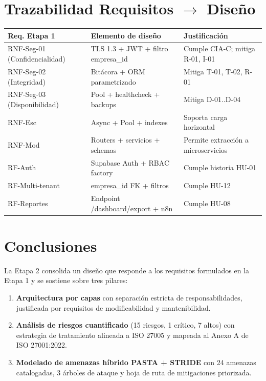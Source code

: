 \documentclass[12pt,a4paper,oneside]{article}
\begin{document}
\section{Trazabilidad Requisitos $\rightarrow$ Diseño}

\begin{table}[h]
\centering
\small
\begin{tabularx}{\textwidth}{llX}
\toprule
\textbf{Req. Etapa 1} & \textbf{Elemento de diseño} & \textbf{Justificación} \\
\midrule
RNF-Seg-01 (Confidencialidad) & TLS 1.3 + JWT + filtro empresa\_id & Cumple CIA-C; mitiga R-01, I-01 \\
RNF-Seg-02 (Integridad) & Bitácora + ORM parametrizado & Mitiga T-01, T-02, R-01 \\
RNF-Seg-03 (Disponibilidad) & Pool + healthcheck + backups & Mitiga D-01..D-04 \\
RNF-Esc & Async + Pool + indexes & Soporta carga horizontal \\
RNF-Mod & Routers + servicios + schemas & Permite extracción a microservicios \\
RF-Auth & Supabase Auth + RBAC factory & Cumple historia HU-01 \\
RF-Multi-tenant & empresa\_id FK + filtros & Cumple HU-12 \\
RF-Reportes & Endpoint /dashboard/export + n8n & Cumple HU-08 \\
\bottomrule
\end{tabularx}
\end{table}

\section{Conclusiones}

La Etapa 2 consolida un diseño que responde a los requisitos formulados en la Etapa 1 y se sostiene sobre tres pilares:

\begin{enumerate}[leftmargin=*]
  \item \textbf{Arquitectura por capas} con separación estricta de responsabilidades, justificada por requisitos de modificabilidad y mantenibilidad.
  \item \textbf{Análisis de riesgos cuantificado} (15 riesgos, 1 crítico, 7 altos) con estrategia de tratamiento alineada a ISO 27005 y mapeada al Anexo A de ISO 27001:2022.
  \item \textbf{Modelado de amenazas híbrido PASTA + STRIDE} con 24 amenazas catalogadas, 3 árboles de ataque y hoja de ruta de mitigaciones priorizada.
\end{enumerate}
\end{document}
